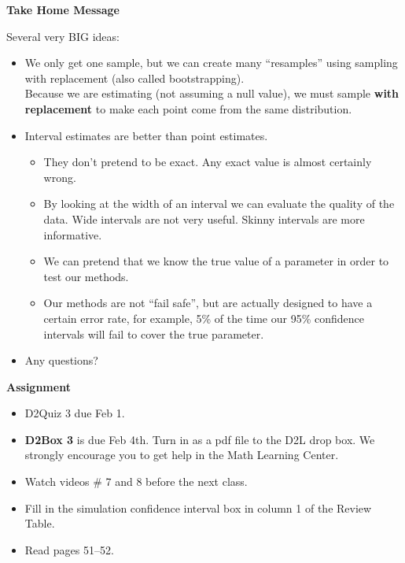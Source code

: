 \begin{center}
  {\large \bf Take Home Message} \vspace{-.5cm}
\end{center}

Several very BIG ideas:\vspace{-.8cm}
\begin{itemize}
\item We only get one sample, but we can create many ``resamples''
  using sampling with replacement (also called bootstrapping).\\
  Because we are estimating (not assuming a null value), we must
  sample {\bf with replacement} to make each point come from the same
  distribution.  

\item Interval estimates are better than point estimates.
  \begin{itemize}
  \item They don't pretend to be exact. Any exact value is almost
    certainly wrong.
  \item By looking at the width of an interval we can evaluate the
    quality of the data.  Wide intervals are not very useful.  Skinny
    intervals are more informative.
  \item We can pretend that we know the true value of a parameter in
    order to test our methods.
  \item Our methods are not ``fail safe'', but are actually designed
    to have a certain error rate, for example, 5\% of the time our
    95\% confidence intervals will fail to cover the true parameter.
  \end{itemize}
 \item 
  Any questions? \vfill
\end{itemize}


\noindent
{\bf Assignment}\vspace{-.5cm}
\begin{itemize}
\item   D2Quiz 3 due Feb 1.
\item {\bf D2Box 3} is due Feb 4th. Turn in as a pdf file to the D2L drop box.
  We strongly encourage you to get help in the Math Learning Center.
 \item Watch videos  \# 7 and 8  before the next class.
\item Fill in the simulation confidence interval box in column 1 of
  the Review Table.

\item Read  pages 51--52.
\end{itemize}






